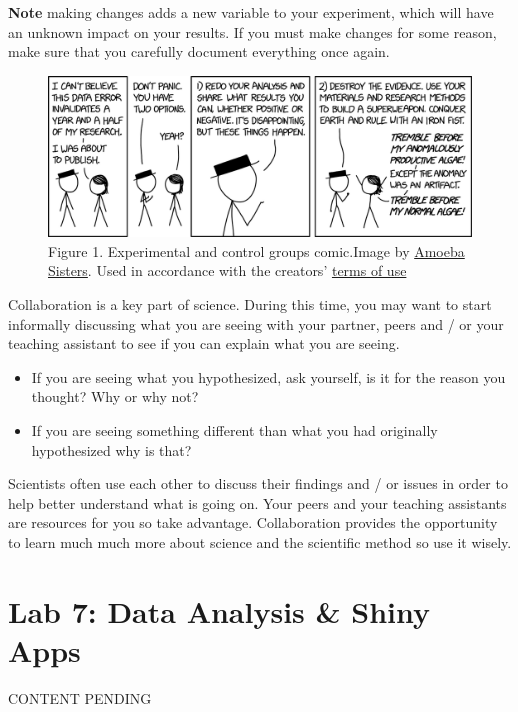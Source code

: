 \documentclass[
]{book}
\providecommand{\tightlist}{%
  \setlength{\itemsep}{0pt}\setlength{\parskip}{0pt}}
\begin{document}
\textbf{Note} making changes adds a new variable to your experiment, which will have an unknown impact on your results. If you must make changes for some reason, make sure that you carefully document everything once again.

\begin{figure}
\centering
\includegraphics{figures_images/Lab8-Fig1.png}
\caption{Figure 1. Experimental and control groups comic.Image by \href{https://www.amoebasisters.com/parameciumparlorcomics/category/nature-of-science/2}{Amoeba Sisters}. Used in accordance with the creators' \href{https://www.amoebasisters.com/termsofuse.html}{terms of use}}
\end{figure}

Collaboration is a key part of science. During this time, you may want to start informally discussing what you are seeing with your partner, peers and / or your teaching assistant to see if you can explain what you are seeing.

\begin{itemize}
\tightlist
\item
  If you are seeing what you hypothesized, ask yourself, is it for the reason you thought? Why or why not?
\item
  If you are seeing something different than what you had originally hypothesized why is that?
\end{itemize}

Scientists often use each other to discuss their findings and / or issues in order to help better understand what is going on. Your peers and your teaching assistants are resources for you so take advantage. Collaboration provides the opportunity to learn much much more about science and the scientific method so use it wisely.

\hypertarget{lab-7-data-analysis-shiny-apps}{%
\chapter*{Lab 7: Data Analysis \& Shiny Apps}\label{lab-7-data-analysis-shiny-apps}}

CONTENT PENDING
\end{document}
